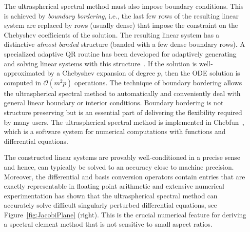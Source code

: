 \documentclass[review]{siamart171218}
\begin{document}
The ultraspherical spectral method must also impose boundary conditions. This is achieved by {\em boundary bordering}, i.e., the last few rows of the resulting linear system are replaced by rows (usually dense) that impose the constraint on the Chebyshev coefficients of the solution. The resulting linear system has a distinctive {\em almost banded} structure (banded with a few dense boundary rows). A specialized adaptive QR routine has been developed for adaptively generating and solving linear systems with this structure~\cite{Olver_13_01}. If the solution is well-approximated by a Chebyshev expansion of degree $p$, then the ODE solution is  computed in $\mathcal{O}(m^2p)$ operations. The technique of boundary bordering allows the ultraspherical spectral method to automatically and conveniently deal with general linear boundary or interior conditions. Boundary bordering is not structure preserving but is an essential part of delivering the flexibility required by many users. The ultraspherical spectral method is implemented in Chebfun~\cite{Chebfun}, which is a software system for numerical computations with functions and differential equations.  

The constructed linear systems are provably well-conditioned in a precise sense~\cite[Lem.~4.4]{Olver_13_01} and hence, can typically be solved to an accuracy close to machine precision. Moreover, the differential and basis conversion operators contain entries that are exactly representable in floating point arithmetic and extensive numerical experimentation has shown that the ultraspherical spectral method can accurately solve difficult singularly perturbed differential equations, see Figure~\ref{fig:JacobiPlane} (right). This is the crucial 
numerical feature for deriving a spectral element method that is not sensitive to small aspect ratios.
\end{document}
